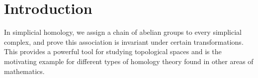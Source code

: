 \section{Introduction}
In simplicial homology, we assign a chain of abelian groups to every simplicial complex, and prove this association is invariant under certain transformations. This provides a powerful tool for studying topological spaces and is the motivating example for different types of homology theory found in other areas of mathematics.
